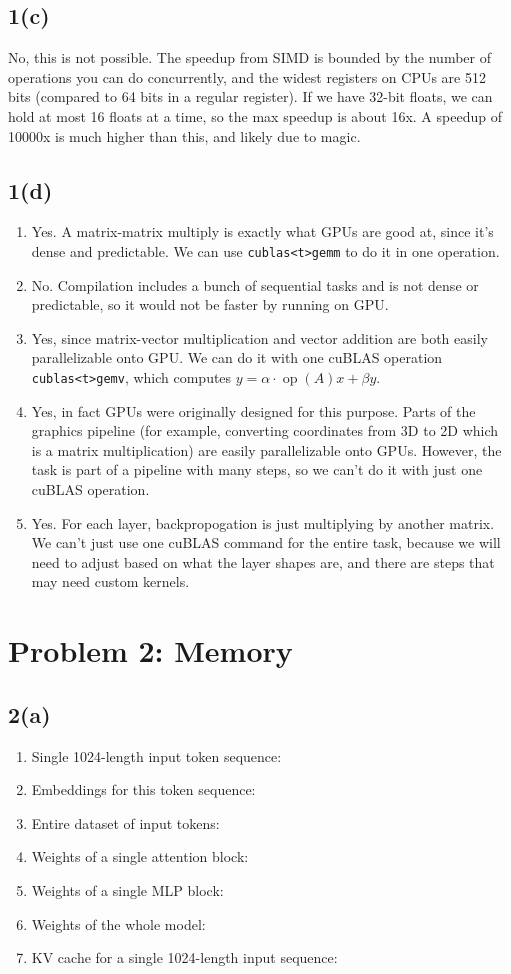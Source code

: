 \documentclass[11pt]{article}
\newcommand{\problem}[2]{\section*{Problem #1: #2}}
\newcommand{\probpart}[1]{\subsection*{#1}}
\begin{document}
\probpart{1(c)}
No, this is not possible. The speedup from SIMD is bounded by the number of operations you can do concurrently, and the widest registers on CPUs are 512 bits (compared to 64 bits in a regular register). If we have 32-bit floats, we can hold at most 16 floats at a time, so the max speedup is about 16x. A speedup of 10000x is much higher than this, and likely due to magic.

\probpart{1(d)}
\begin{enumerate}[label=(\roman*)]
  \item Yes. A matrix-matrix multiply is exactly what GPUs are good at, since it's dense and predictable. We can use \texttt{cublas<t>gemm} to do it in one operation.

  \item No. Compilation includes a bunch of sequential tasks and is not dense or predictable, so it would not be faster by running on GPU.

  \item Yes, since matrix-vector multiplication and vector addition are both easily parallelizable onto GPU. We can do it with one cuBLAS operation \texttt{cublas<t>gemv}, which computes $y = \alpha \cdot \operatorname{op}(A)x + \beta y$.

  \item Yes, in fact GPUs were originally designed for this purpose. Parts of the graphics pipeline (for example, converting coordinates from 3D to 2D which is a matrix multiplication) are easily parallelizable onto GPUs. However, the task is part of a pipeline with many steps, so we can't do it with just one cuBLAS operation.

  \item Yes. For each layer, backpropogation is just multiplying by another matrix. We can't just use one cuBLAS command for the entire task, because we will need to adjust based on what the layer shapes are, and there are steps that may need custom kernels.
\end{enumerate}

\newpage
\problem{2}{Memory}

\probpart{2(a)}
\begin{enumerate}[label=\roman*.]
  \item Single 1024-length input token sequence:
  \item Embeddings for this token sequence:
  \item Entire dataset of input tokens:
  \item Weights of a single attention block:
  \item Weights of a single MLP block:
  \item Weights of the whole model:
  \item KV cache for a single 1024-length input sequence:
\end{enumerate}
\end{document}
